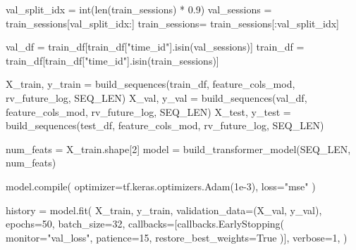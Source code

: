 \documentclass[
  letterpaper,
  DIV=11,
  numbers=noendperiod]{scrartcl}
\newenvironment{Shaded}{\begin{snugshade}}{\end{snugshade}}
\newcommand{\BuiltInTok}[1]{\textcolor[rgb]{0.00,0.23,0.31}{#1}}
\newcommand{\DecValTok}[1]{\textcolor[rgb]{0.68,0.00,0.00}{#1}}
\newcommand{\FloatTok}[1]{\textcolor[rgb]{0.68,0.00,0.00}{#1}}
\newcommand{\NormalTok}[1]{\textcolor[rgb]{0.00,0.23,0.31}{#1}}
\newcommand{\OperatorTok}[1]{\textcolor[rgb]{0.37,0.37,0.37}{#1}}
\newcommand{\StringTok}[1]{\textcolor[rgb]{0.13,0.47,0.30}{#1}}
\newcommand{\VariableTok}[1]{\textcolor[rgb]{0.07,0.07,0.07}{#1}}
\begin{document}
\begin{Shaded}
\begin{Highlighting}[]
\NormalTok{val\_split\_idx }\OperatorTok{=} \BuiltInTok{int}\NormalTok{(}\BuiltInTok{len}\NormalTok{(train\_sessions) }\OperatorTok{*} \FloatTok{0.9}\NormalTok{)}
\NormalTok{val\_sessions  }\OperatorTok{=}\NormalTok{ train\_sessions[val\_split\_idx:]}
\NormalTok{train\_sessions}\OperatorTok{=}\NormalTok{ train\_sessions[:val\_split\_idx]}

\NormalTok{val\_df }\OperatorTok{=}\NormalTok{ train\_df[train\_df[}\StringTok{"time\_id"}\NormalTok{].isin(val\_sessions)]}
\NormalTok{train\_df }\OperatorTok{=}\NormalTok{ train\_df[train\_df[}\StringTok{"time\_id"}\NormalTok{].isin(train\_sessions)]}

\NormalTok{X\_train, y\_train }\OperatorTok{=}\NormalTok{ build\_sequences(train\_df, feature\_cols\_mod, }\StringTok{\textquotesingle{}rv\_future\_log\textquotesingle{}}\NormalTok{, SEQ\_LEN)}
\NormalTok{X\_val,   y\_val   }\OperatorTok{=}\NormalTok{ build\_sequences(val\_df,   feature\_cols\_mod, }\StringTok{\textquotesingle{}rv\_future\_log\textquotesingle{}}\NormalTok{, SEQ\_LEN)}
\NormalTok{X\_test,  y\_test  }\OperatorTok{=}\NormalTok{ build\_sequences(test\_df,  feature\_cols\_mod, }\StringTok{\textquotesingle{}rv\_future\_log\textquotesingle{}}\NormalTok{, SEQ\_LEN)}
\end{Highlighting}
\end{Shaded}

\begin{Shaded}
\begin{Highlighting}[]
\NormalTok{num\_feats }\OperatorTok{=}\NormalTok{ X\_train.shape[}\DecValTok{2}\NormalTok{]  }
\NormalTok{model }\OperatorTok{=}\NormalTok{ build\_transformer\_model(SEQ\_LEN, num\_feats)}

\NormalTok{model.}\BuiltInTok{compile}\NormalTok{(}
\NormalTok{    optimizer}\OperatorTok{=}\NormalTok{tf.keras.optimizers.Adam(}\FloatTok{1e{-}3}\NormalTok{),}
\NormalTok{    loss}\OperatorTok{=}\StringTok{"mse"}
\NormalTok{)}

\NormalTok{history }\OperatorTok{=}\NormalTok{ model.fit(}
\NormalTok{    X\_train, y\_train,}
\NormalTok{    validation\_data}\OperatorTok{=}\NormalTok{(X\_val, y\_val),}
\NormalTok{    epochs}\OperatorTok{=}\DecValTok{50}\NormalTok{,}
\NormalTok{    batch\_size}\OperatorTok{=}\DecValTok{32}\NormalTok{,}
\NormalTok{    callbacks}\OperatorTok{=}\NormalTok{[callbacks.EarlyStopping(}
\NormalTok{        monitor}\OperatorTok{=}\StringTok{"val\_loss"}\NormalTok{, patience}\OperatorTok{=}\DecValTok{15}\NormalTok{, restore\_best\_weights}\OperatorTok{=}\VariableTok{True}
\NormalTok{    )],}
\NormalTok{    verbose}\OperatorTok{=}\DecValTok{1}\NormalTok{,}
\NormalTok{)}
\end{Highlighting}
\end{Shaded}
\end{document}
